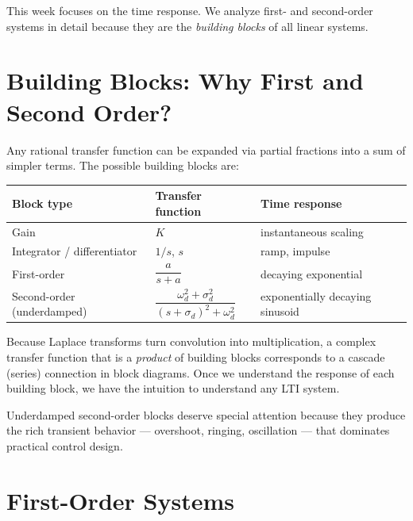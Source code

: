 \documentclass[12pt]{article}
\begin{document}
This week focuses on the time response.  We analyze first- and second-order
systems in detail because they are the \emph{building blocks} of all linear
systems.

\section{Building Blocks: Why First and Second Order?}
\label{sec:blocks}

Any rational transfer function can be expanded via partial fractions into a
sum of simpler terms.  The possible building blocks are:

\begin{center}
\begin{tabular}{lll}
  \toprule
  Block type & Transfer function & Time response \\
  \midrule
  Gain & $K$ & instantaneous scaling \\
  Integrator / differentiator & $1/s$, $s$ & ramp, impulse \\
  First-order & $\dfrac{a}{s+a}$ & decaying exponential \\
  Second-order (underdamped) & $\dfrac{\omega_d^2+\sigma_d^2}{(s+\sigma_d)^2+\omega_d^2}$ &
    exponentially decaying sinusoid \\
  \bottomrule
\end{tabular}
\end{center}

Because Laplace transforms turn convolution into multiplication, a complex
transfer function that is a \emph{product} of building blocks corresponds to
a cascade (series) connection in block diagrams.  Once we understand the
response of each building block, we have the intuition to understand any
LTI system.

Underdamped second-order blocks deserve special attention because they produce
the rich transient behavior --- overshoot, ringing, oscillation --- that
dominates practical control design.

\section{First-Order Systems}
\label{sec:first}
\end{document}

